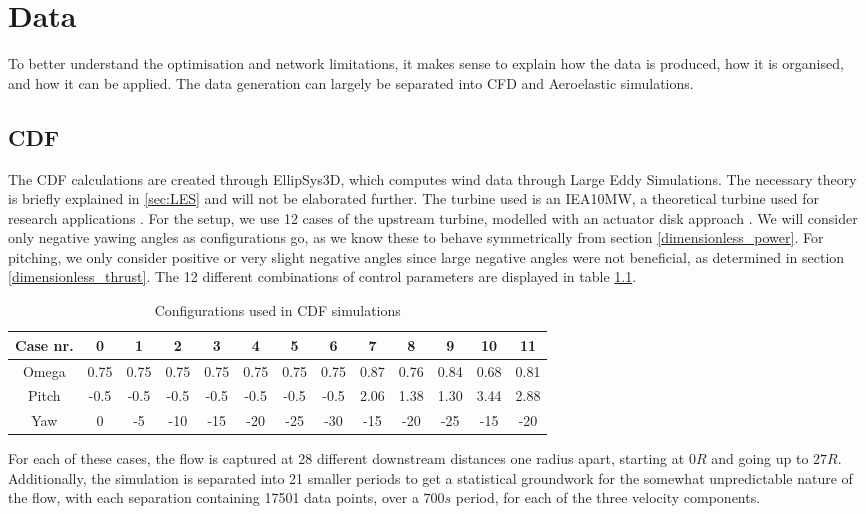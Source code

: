 \chapter{Data}
\label{chap:data}

To better understand the optimisation and network limitations, it makes sense to explain how the data is produced, how it is organised, and how it can be applied. The data generation can largely be separated into CFD and Aeroelastic simulations. 

\section{CDF}

The CDF calculations are created through EllipSys3D, which computes wind data through Large Eddy Simulations. The necessary theory is briefly explained in \ref{sec:LES} and will not be elaborated further. The turbine used is an IEA10MW, a theoretical turbine used for research applications \cite{turbineref}. For the setup, we use 12 cases of the upstream turbine, modelled with an actuator disk approach \cite{actuatordisk}. We will consider only negative yawing angles as configurations go, as we know these to behave symmetrically from section \ref{dimensionless_power}. For pitching, we only consider positive or very slight negative angles since large negative angles were not beneficial, as determined in section \ref{dimensionless_thrust}. The 12 different combinations of control parameters are displayed in table \ref{table:configurations}.

\begin{table}[H]
\begin{tabular}{|c|c|c|c|c|c|c|c|c|c|c|c|c|}
\hline
Case nr. & 0    & 1    & 2    & 3    & 4    & 5    & 6    & 7    & 8    & 9    & 10   & 11   \\ \hline
Omega    & 0.75 & 0.75 & 0.75 & 0.75 & 0.75 & 0.75 & 0.75 & 0.87 & 0.76 & 0.84 & 0.68 & 0.81 \\ \hline
Pitch    & -0.5    & -0.5   & -0.5    & -0.5  & -0.5 & -0.5 & -0.5 & 2.06 & 1.38 & 1.30 & 3.44 & 2.88  \\ \hline
Yaw      & 0    & -5    & -10   & -15   & -20   & -25   & -30   & -15   & -20   & -25   & -15   & -20   \\ \hline
\end{tabular}
\caption{Configurations used in CDF simulations}
\label{table:configurations}
\end{table}

For each of these cases, the flow is captured at 28 different downstream distances one radius apart, starting at $0R$ and going up to $27R$. Additionally, the simulation is separated into 21 smaller periods to get a statistical groundwork for the somewhat unpredictable nature of the flow, with each separation containing 17501 data points, over a $700s$ period, for each of the three velocity components. 


